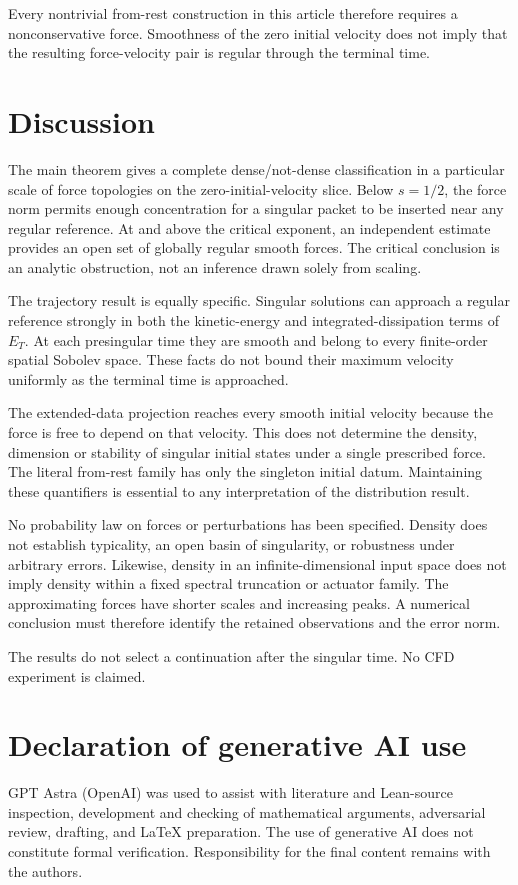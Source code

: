 \documentclass[11pt,a4paper]{article}
\theoremstyle{definition}\newtheorem{definition}[theorem]{Definition}
\theoremstyle{remark}\newtheorem{remark}[theorem]{Remark}
\begin{document}
Every nontrivial from-rest construction in this article therefore requires a nonconservative force. Smoothness of the zero initial velocity does not imply that the resulting force-velocity pair is regular through the terminal time.

\section{Discussion}\label{sec:discussion}
The main theorem gives a complete dense/not-dense classification in a particular scale of force topologies on the zero-initial-velocity slice. Below $s=1/2$, the force norm permits enough concentration for a singular packet to be inserted near any regular reference. At and above the critical exponent, an independent estimate provides an open set of globally regular smooth forces. The critical conclusion is an analytic obstruction, not an inference drawn solely from scaling.

The trajectory result is equally specific. Singular solutions can approach a regular reference strongly in both the kinetic-energy and integrated-dissipation terms of $E_T$. At each presingular time they are smooth and belong to every finite-order spatial Sobolev space. These facts do not bound their maximum velocity uniformly as the terminal time is approached.

The extended-data projection reaches every smooth initial velocity because the force is free to depend on that velocity. This does not determine the density, dimension or stability of singular initial states under a single prescribed force. The literal from-rest family has only the singleton initial datum. Maintaining these quantifiers is essential to any interpretation of the distribution result.

No probability law on forces or perturbations has been specified. Density does not establish typicality, an open basin of singularity, or robustness under arbitrary errors. Likewise, density in an infinite-dimensional input space does not imply density within a fixed spectral truncation or actuator family. The approximating forces have shorter scales and increasing peaks. A numerical conclusion must therefore identify the retained observations and the error norm.

The results do not select a continuation after the singular time. No CFD experiment is claimed.

\section*{Declaration of generative AI use}
GPT Astra (OpenAI) was used to assist with literature and Lean-source inspection, development and checking of mathematical arguments, adversarial review, drafting, and LaTeX preparation. The use of generative AI does not constitute formal verification. Responsibility for the final content remains with the authors.
\end{document}
